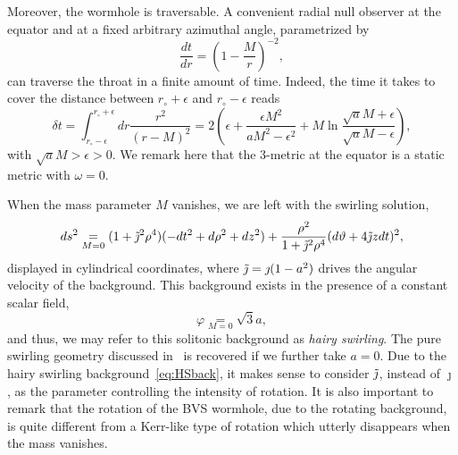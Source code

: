 \documentclass[aps,preprint,groupedaddress,nofootinbib,superscriptaddress,showkeys,showpacs,eqsecnum,amsmath,amssymb]{revtex4-1}
\begin{document}
Moreover, the wormhole is traversable. A convenient radial null observer at the equator and at a fixed arbitrary azimuthal angle, parametrized by 
\begin{equation}
    \frac{dt}{dr}=\left(1-\frac{M}{r}\right)^{-2},
\end{equation}
can traverse the throat in a finite amount of time. Indeed, the time it takes to cover the distance between $r_\circ+\epsilon$ and $r_\circ-\epsilon$ reads 
\begin{equation}
    \delta t= \int_{r_\circ-\epsilon}^{r_\circ + \epsilon}dr \frac{r^2}{(r-M)^2} = 2\left( \epsilon + \frac{\epsilon M^2}{a M^2 - \epsilon^2}+M\ln \frac{\sqrt{a} M+\epsilon}{\sqrt{a} M -\epsilon}\right),
\end{equation}
with $\sqrt{a}M>\epsilon>0$. We remark here that the 3-metric at the equator is a static metric with $\omega=0$. 

When the mass parameter $M$ vanishes, we are left with the swirling solution,
\begin{equation}
    ds^2 \underset{M=0}{=} (1+\tilde{\jmath}^2\rho^4)(-dt^2+d\rho^2+dz^2)+\frac{\rho^2}{1+\Tilde{\jmath}^2\rho^4}(d\vartheta + 4 \Tilde{\jmath}z dt)^2,\label{eq:HSback}
\end{equation}
displayed in cylindrical coordinates, where $\Tilde{\jmath}=\jmath (1-a^2)$ drives the angular velocity of the background. This background exists in the presence of a constant scalar field,
\begin{equation}
    \varphi \underset{M=0}{=} \sqrt{3}a,
\end{equation}
and thus, we may refer to this solitonic background as \emph{hairy swirling}. The pure swirling geometry discussed in~\cite{Astorino:2022aam,Gibbons:2013yq} is recovered if we further take $a=0$. Due to the hairy swirling background~\eqref{eq:HSback}, it makes sense to consider $\Tilde{\jmath}$, instead of $\jmath$, as the parameter controlling the intensity of rotation. It is also important to remark that the rotation of the BVS wormhole, due to the rotating background, is quite different from a Kerr-like type of rotation which utterly disappears when the mass vanishes. 
\end{document}
